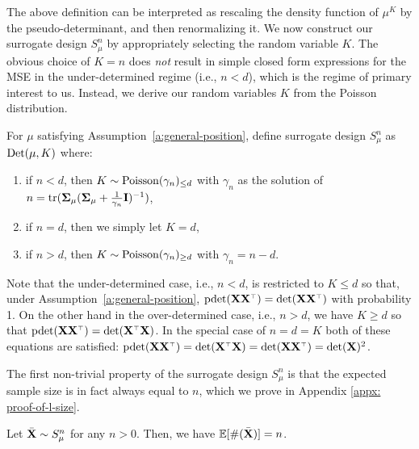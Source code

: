 \documentclass[thesis.tex]{subfiles}
\begin{document}
\noindent
The above definition can be
interpreted as rescaling the density function of $\mu^K$ by the
pseudo-determinant, and then renormalizing it.
We now construct our surrogate design $S_\mu^n$ by appropriately
selecting the random variable $K$.
The obvious choice of $K=n$ does \emph{not} result in simple closed
form expressions for the MSE in the under-determined regime (i.e.,
$n<d$), which is the regime of primary interest to us.
Instead, we derive our random variables $K$ from the Poisson
distribution.
\begin{definition}\label{d:surrogate}
  For $\mu$ satisfying Assumption~\ref{a:general-position},
  define surrogate design $S_\mu^n$ as ${\mathrm{Det}}(\mu,K)$ where:
  \vspace{-2mm}
  \begin{enumerate}
    \item if $n<d$, then $K\sim {\operatorname{Poisson}}(\gamma_n)_{\leq d}$ with
          $\gamma_n$ as the solution of
          $n=\mathrm{tr}(\mathbf{\Sigma}_\mu(\mathbf{\Sigma}_\mu+\frac1{\gamma_n}\mathbf I)^{-1})$,
          \vspace{-2mm}
    \item if $n=d$, then we simply let $K=d$,
          \vspace{-2mm}
    \item if $n>d$, then $K\sim{\operatorname{Poisson}}(\gamma_n)_{\geq d}$ with $\gamma_n=n-d$.
  \end{enumerate}
\end{definition}

\noindent
Note that the under-determined case, i.e., $n<d$, is restricted to $K\leq d$ so that, under Assumption~\ref{a:general-position}, $\pdet(\X\X^\top)=\det(\X\X^\top)$ with probability 1.
On the other hand in the over-determined case, i.e., $n>d$, we have
$K\geq d$ so that $\pdet(\X\X^\top)=\det(\X^\top\X)$. In the special case
of $n=d=K$ both of these equations are satisfied: $\pdet(\X\X^\top)=\det(\X^\top\X)=\det(\X\X^\top)=\det(\X)^2$.

The first non-trivial property of the surrogate design $S_\mu^n$ is
that the expected sample size is in fact always equal to $n$, which we
prove in Appendix \ref{appx: proof-of-l-size}.
\begin{lemma} \label{l:size}
  Let ${\bar{\mathbf X}}\sim S_\mu^n$ for any $n>0$.
  Then, we have $\mathbb E[\#({\bar{\mathbf X}})] = n$.
\end{lemma}
\end{document}
